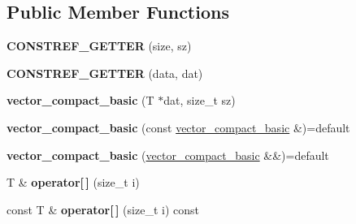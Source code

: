 \subsection*{Public Member Functions}
\begin{DoxyCompactItemize}
\item 
{\bfseries C\+O\+N\+S\+T\+R\+E\+F\+\_\+\+G\+E\+T\+T\+ER} (size, sz)\hypertarget{classmalgo_1_1vector__compact__basic_ab0c5dfbfca7066bab8448d487b3d9608}{}\label{classmalgo_1_1vector__compact__basic_ab0c5dfbfca7066bab8448d487b3d9608}

\item 
{\bfseries C\+O\+N\+S\+T\+R\+E\+F\+\_\+\+G\+E\+T\+T\+ER} (data, dat)\hypertarget{classmalgo_1_1vector__compact__basic_a5844e2382d42eba1cfc8d289238b34e8}{}\label{classmalgo_1_1vector__compact__basic_a5844e2382d42eba1cfc8d289238b34e8}

\item 
{\bfseries vector\+\_\+compact\+\_\+basic} (T $\ast$dat, size\+\_\+t sz)\hypertarget{classmalgo_1_1vector__compact__basic_ace76f3956ba6d70bd01381db5c2d7dfa}{}\label{classmalgo_1_1vector__compact__basic_ace76f3956ba6d70bd01381db5c2d7dfa}

\item 
{\bfseries vector\+\_\+compact\+\_\+basic} (const \hyperlink{classmalgo_1_1vector__compact__basic}{vector\+\_\+compact\+\_\+basic} \&)=default\hypertarget{classmalgo_1_1vector__compact__basic_a5e04a8d7f32d2ae3cfe5dd7c51840619}{}\label{classmalgo_1_1vector__compact__basic_a5e04a8d7f32d2ae3cfe5dd7c51840619}

\item 
{\bfseries vector\+\_\+compact\+\_\+basic} (\hyperlink{classmalgo_1_1vector__compact__basic}{vector\+\_\+compact\+\_\+basic} \&\&)=default\hypertarget{classmalgo_1_1vector__compact__basic_a973abae5c3db325c763f7870c6b386fe}{}\label{classmalgo_1_1vector__compact__basic_a973abae5c3db325c763f7870c6b386fe}

\item 
T \& {\bfseries operator\mbox{[}$\,$\mbox{]}} (size\+\_\+t i)\hypertarget{classmalgo_1_1vector__compact__basic_a41cdce07655ef1b947e1e77c100b3688}{}\label{classmalgo_1_1vector__compact__basic_a41cdce07655ef1b947e1e77c100b3688}

\item 
const T \& {\bfseries operator\mbox{[}$\,$\mbox{]}} (size\+\_\+t i) const \hypertarget{classmalgo_1_1vector__compact__basic_a2978308bb706353833d2e14f025090be}{}\label{classmalgo_1_1vector__compact__basic_a2978308bb706353833d2e14f025090be}


\end{DoxyCompactItemize}
